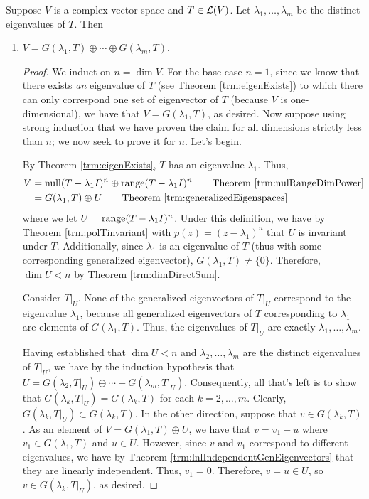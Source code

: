 \documentclass[../main.tex]{subfiles}
\begin{document}
\begin{itemize}
    \begin{theorem}\label{trm:genEigenDecomp}
        Suppose $V$ is a complex vector space and $T\in\mathcal{L}(V)$. Let $\lambda_1,\dots,\lambda_m$ be the distinct eigenvalues of $T$. Then
        \begin{enumerate}[label={\textup{(}\alph*\textup{)}},ref={\thetheorem\alph*}]
            \item \label{trm:genEigenDecompa}$V=G(\lambda_1,T)\oplus\cdots\oplus G(\lambda_m,T)$.
            \begin{proof}
                We induct on $n=\dim V$. For the base case $n=1$, since we know that there exists \emph{an} eigenvalue of $T$ (see Theorem \ref{trm:eigenExists}) to which there can only correspond one set of eigenvector of $T$ (because $V$ is one-dimensional), we have that $V=G(\lambda_1,T)$, as desired. Now suppose using strong induction that we have proven the claim for all dimensions strictly less than $n$; we now seek to prove it for $n$. Let's begin.\par
                By Theorem \ref{trm:eigenExists}, $T$ has an eigenvalue $\lambda_1$. Thus,
                \begin{align*}
                    V &= \nul(T-\lambda_1I)^n\oplus\range(T-\lambda_1I)^n\tag*{Theorem \ref{trm:nulRangeDimPower}}\\
                    &= G(\lambda_1,T)\oplus U\tag*{Theorem \ref{trm:generalizedEigenspaces}}
                \end{align*}
                where we let $U=\operatorname{range}(T-\lambda_1I)^n$. Under this definition, we have by Theorem \ref{trm:polTinvariant} with $p(z)=(z-\lambda_1)^n$ that $U$ is invariant under $T$. Additionally, since $\lambda_1$ is an eigenvalue of $T$ (thus with some corresponding generalized eigenvector), $G(\lambda_1,T)\neq\{0\}$. Therefore, $\dim U<n$ by Theorem \ref{trm:dimDirectSum}.\par
                Consider $T|_U$. None of the generalized eigenvectors of $T|_U$ correspond to the eigenvalue $\lambda_1$, because all generalized eigenvectors of $T$ corresponding to $\lambda_1$ are elements of $G(\lambda_1,T)$. Thus, the eigenvalues of $T|_U$ are exactly $\lambda_1,\dots,\lambda_m$.\par
                Having established that $\dim U<n$ and $\lambda_2,\dots,\lambda_m$ are the distinct eigenvalues of $T|_U$, we have by the induction hypothesis that $U=G(\lambda_2,T|_U)\oplus\cdots+G(\lambda_m,T|_U)$. Consequently, all that's left is to show that $G(\lambda_k,T|_U)=G(\lambda_k,T)$ for each $k=2,\dots,m$. Clearly, $G(\lambda_k,T|_U)\subset G(\lambda_k,T)$. In the other direction, suppose that $v\in G(\lambda_k,T)$. As an element of $V=G(\lambda_1,T)\oplus U$, we have that $v=v_1+u$ where $v_1\in G(\lambda_1,T)$ and $u\in U$. However, since $v$ and $v_1$ correspond to different eigenvalues, we have by Theorem \ref{trm:lnlIndependentGenEigenvectors} that they are linearly independent. Thus, $v_1=0$. Therefore, $v=u\in U$, so $v\in G(\lambda_k,T|_U)$, as desired.

\end{proof}
\end{enumerate}
\end{theorem}
\end{itemize}
\end{document}

